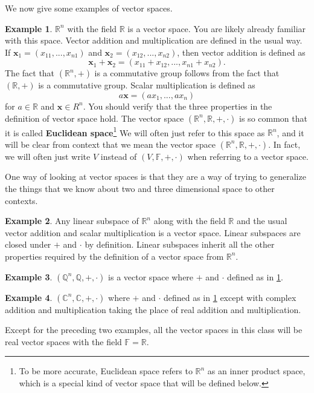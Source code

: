 \documentclass[12pt,reqno]{amsart}
\def\F{\mathbb{F}}
\def\R{\mathbb{R}}
\theoremstyle{definition}
\newtheorem{example}{Example}[section]
\begin{document}
We now give some examples of vector spaces. 
\begin{example} \label{ex:Rn}
  $\R^n$ with the field $\R$ is a vector space. You are likely already
  familiar with this space. Vector addition and multiplication are
  defined in the usual way. If $\mathbf{x}_1 = (x_{11}, ..., x_{n1})$
  and $\mathbf{x}_2 = (x_{12}, ..., x_{n2})$, then vector addition is
  defined as
  \[ \mathbf{x}_1 + \mathbf{x}_2 = (x_{11}+x_{12}, ... , x_{n1} +
  x_{n2}). \]
  The fact that $(\R^n,+)$ is a commutative group follows from the
  fact that $(\R,+)$ is a commutative group. Scalar multiplication is
  defined as
  \[ a \mathbf{x} = (a x_1, ..., ax_n) \] for $a \in \R$ and
  $\mathbf{x} \in R^n$. You should verify that the three properties in
  the definition of vector space hold.  The vector space $(\R^n, \R,
  +, \cdot)$ is so common that it is called \textbf{Euclidean
    space}\footnote{To be more accurate, Euclidean space refers to
    $\R^n$ as an inner product space, which is a special kind of
    vector space that will be defined below.} We will often just refer
  to this space as $\R^n$, and it will be clear from context that we
  mean the vector space $(\R^n, \R, + , \cdot)$. In fact, we will
  often just write $V$ instead of $(V,\F,+,\cdot)$ when referring to a
  vector space.
\end{example}
One way of looking at vector spaces is that they are a way of trying
to generalize the things that we know about two and three dimensional
space to other contexts. 
\begin{example}
  Any linear subspace of $\R^n$ along with the field
  $\R$ and the usual vector addition and scalar multiplication is a
  vector space. Linear subspaces are closed under $+$ and $\cdot$ by
  definition. Linear subspaces inherit all the other properties
  required by the definition of a vector space from $\R^n$.
\end{example}

\begin{example}
  $(\mathbb{Q}^n, \mathbb{Q}, +, \cdot)$ is a vector space
  where $+$ and $\cdot$ defined as in \ref{ex:Rn}.
\end{example}

\begin{example}
  $(\mathbb{C}^n, \mathbb{C}, +, \cdot)$ where $+$ and $\cdot$ defined
  as in \ref{ex:Rn} except with complex addition and multiplication
  taking the place of real addition and multiplication. 
\end{example}
Except for the preceding two examples, all the vector spaces in this
class will be real vector spaces with the field $\mathbb{F} =
\mathbb{R}$. 
\end{document}
